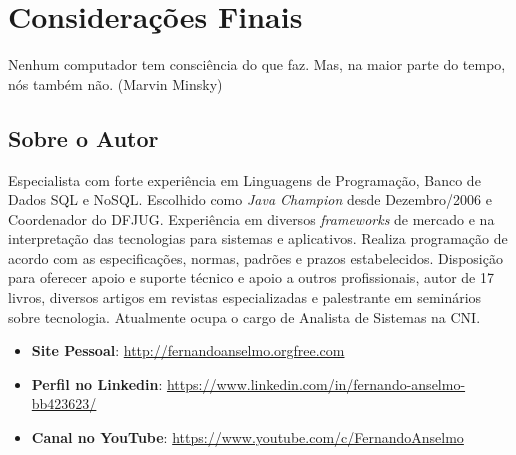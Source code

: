 \documentclass[a4paper,11pt]{book} %
\begin{document}

\pagestyle{empty} %
\tableofcontents %
\cleardoublepage %
\pagestyle{fancy} %
\clearpage %








% 
\appendix
\chapter{Considerações Finais}
\begin{remark}
Nenhum computador tem consciência do que faz. 
Mas, na maior parte do tempo, nós também não. (Marvin Minsky)
\end{remark}

\section{Sobre o Autor}
Especialista com forte experiência em Linguagens de Programação, Banco de Dados SQL e NoSQL. Escolhido como \textit{Java Champion} desde Dezembro/2006 e Coordenador do DFJUG. Experiência em diversos \textit{frameworks} de mercado e na interpretação das tecnologias para sistemas e aplicativos. Realiza programação de acordo com as especificações, normas, padrões e prazos estabelecidos. Disposição para oferecer apoio e suporte técnico e apoio a outros profissionais, autor de 17 livros, diversos artigos em revistas especializadas e palestrante em seminários sobre tecnologia. Atualmente ocupa o cargo de Analista de Sistemas na CNI.
\begin{itemize}
 \item \textbf{Site Pessoal}: \url{http://fernandoanselmo.orgfree.com}
 \item \textbf{Perfil no Linkedin}: \url{https://www.linkedin.com/in/fernando-anselmo-bb423623/}
 \item \textbf{Canal no YouTube}: \url{https://www.youtube.com/c/FernandoAnselmo}
\end{itemize}
\end{document}
